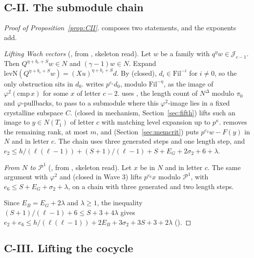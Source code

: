 \documentclass[11pt]{article}
\newcommand{\NN}{N^{\Delta}}
\newcommand{\Pp}{\mathcal P}
\newcommand{\Fil}{\mathrm{Fil}}
\theoremstyle{definition}
\theoremstyle{remark}
\begin{document}
\subsection*{C-II. The submodule chain}

\begin{proof}[Proof of Proposition~\ref{prop:CII}]
 composes two statements, and the exponents add.

\emph{Lifting Wach vectors} (, from , skeleton read). Let $w$ be a family with $q^\eta w\in\mathcal J_{c-1}$. Then $Q^{\eta+b_c+S}w\in N$ and $(\gamma-1)w\in N$. Expand $\mathrm{levN}(Q^{\eta+b_c+S}w)=(Xu)^{\eta+b_c+S}d$. By  (closed), $d_i\in\Fil^{-i}$ for $i\ne0$, so the only obstruction sits in $d_0$.  writes $p^{e_c}d_0$, modulo $\Fil^{-\eta}$, as the image of $\varphi^2(\mathrm{cmp}\,x)$ for some $x$ of letter $c-2$.  uses , the length count of $\NN$ modulo $\pi_0$ and $\varphi$-pullbacks, to pass to a submodule where this $\varphi^2$-image lies in a fixed crystalline subspace $C$.  (closed in mechanism, Section~\ref{sec:fifth}) lifts such an image to $y\in N(T_1)$ of letter $c$ with matching level expansion up to $p^\kappa$.  removes the remaining rank, at most $m$, and  (Section~\ref{sec:memcrit}) puts $p^{e_2}w-F(y)$ in $N$ and in letter $c$. The chain uses three generated steps and one length step, and $e_2\le h/(\ell(\ell-1))+(S+1)/(\ell-1)+S+E_G+2\sigma_2+6+\lambda$.

\emph{From $N$ to $\Pp^1$} (, from , skeleton read). Let $x$ be in $N$ and in letter $c$. The same argument with $\varphi^2$ and  (closed in Wave 3) lifts $p^{e_6}x$ modulo $\Pp^1$, with $e_6\le S+E_G+\sigma_2+\lambda$, on a chain with three generated and two length steps.

Since $E_B=E_G+2\lambda$ and $\lambda\ge1$, the inequality $(S+1)/(\ell-1)+6\le S+3+4\lambda$ gives $e_2+e_6\le h/(\ell(\ell-1))+2E_B+3\sigma_2+3S+3+2\lambda$ ().
\end{proof}

\subsection*{C-III. Lifting the cocycle}
\end{document}

